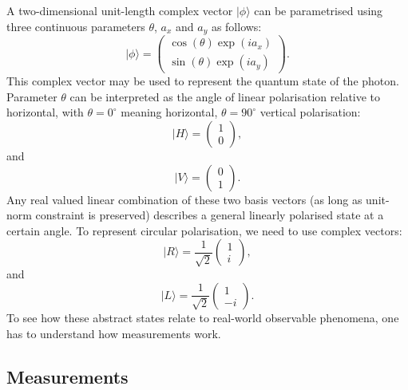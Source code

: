 A two-dimensional unit-length complex vector $\vert \phi \rangle$ can be parametrised using three continuous parameters $\theta$, $a_x$ and $a_y$ as follows:
%
\begin{equation}
	\vert \phi \rangle = \left(\begin{array}{c}
		\cos(\theta)\exp(ia_x)\\
		\sin(\theta)\exp(ia_y)\end{array}\right).
\end{equation}
%
This complex vector may be used to represent the quantum state of the photon. Parameter $\theta$ can be interpreted as the angle of linear polarisation relative to horizontal, with $\theta = 0^{\circ}$ meaning horizontal, $\theta=90^{\circ}$ vertical polarisation:
%
\begin{equation}
	\vert H \rangle = \left(\begin{array}{c}
		1\\
		0\end{array}\right),
	\label{eqn:quantum_photon_horizontal}
\end{equation}
and
\begin{equation}
	\vert V \rangle = \left(\begin{array}{c}
		0\\
		1\end{array}\right).
	\label{eqn:quantum_photon_vertical}
\end{equation}
%
Any real valued linear combination of these two basis vectors (as long as unit-norm constraint is preserved) describes a general linearly polarised state at a certain angle. To represent circular polarisation, we need to use complex vectors:
%
\begin{equation}
	\vert R \rangle = \frac{1}{\sqrt{2}}\left(\begin{array}{c}
		1\\
		i\end{array}\right),
	\label{eqn:quantum_photon_right}
\end{equation}
%
and
%
\begin{equation}
	\vert L \rangle = \frac{1}{\sqrt{2}}\left(\begin{array}{c}
		1\\
		-i\end{array}\right).
	\label{eqn:quantum_photon_left}
\end{equation}
%
To see how these abstract states relate to real-world observable phenomena, one has to understand how measurements work.

\subsection{Measurements}

